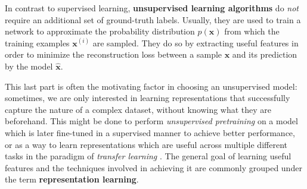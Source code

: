 \documentclass[11pt]{article}
\theoremstyle{remark}
\begin{document}
In contrast to supervised learning, \textbf{unsupervised learning algorithms} do \textit{not} require an additional set of ground-truth labels. Usually, they are used to train a network to approximate the probability distribution $p(\bm{x})$ from which the training examples $\bm{x}^{(i)}$ are sampled. They do so by extracting useful features in order to minimize the reconstruction loss between a sample $\bm{x}$ and its prediction by the model $\bm{\hat{x}}$.

This last part is often the motivating factor in choosing an unsupervised model: sometimes, we are only interested in learning representations that successfully capture the nature of a complex dataset, without knowing what they are beforehand. This might be done to perform \textit{unsupervised pretraining} on a model which is later fine-tuned in a supervised manner to achieve better performance, or as a way to learn representations which are useful across multiple different tasks in the paradigm of \textit{transfer learning} \cite{mesnil2012unsupervised}. The general goal of learning useful features and the techniques involved in achieving it are commonly grouped under the term \textbf{representation learning}.
\end{document}
